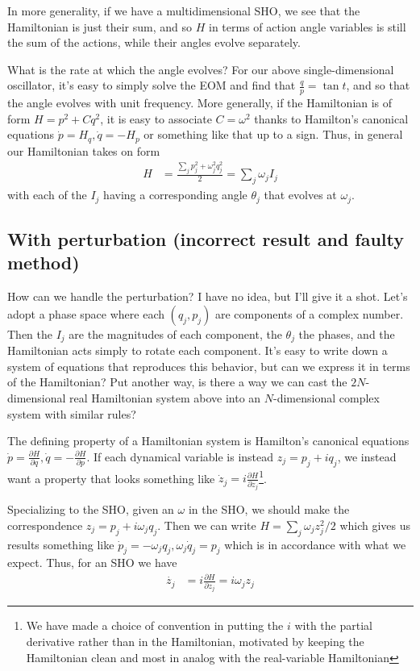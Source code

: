\documentclass[10pt]{article}
\newcommand{\pd}[2]{\frac{\partial#1}{\partial#2}}
\begin{document}
In more generality, if we have a multidimensional SHO, we see that the
Hamiltonian is just their sum, and so $H$ in terms of action angle variables is
still the sum of the actions, while their angles evolve separately.

What is the rate at which the angle evolves? For our above single-dimensional
oscillator, it's easy to simply solve the EOM and find that $\frac{q}{p} = \tan
t$, and so that the angle evolves with unit frequency. More generally, if the
Hamiltonian is of form $H = p^2 + Cq^2$, it is easy to associate $C = \omega^2$
thanks to Hamilton's canonical equations $\dot{p} = H_q, \dot{q} = -H_p$ or
something like that up to a sign. Thus, in general our Hamiltonian takes on form
\begin{align}
    H &= \frac{\sum_j p_j^2 + \omega_j^2q_j^2}{2} = \sum_j \omega_j I_j
\end{align}
with each of the $I_j$ having a corresponding angle $\theta_j$ that evolves at
$\omega_j$.

\subsection{With perturbation (incorrect result and faulty method)}

How can we handle the perturbation? I have no idea, but I'll give it a shot.
Let's adopt a phase space where each $(q_j, p_j)$ are components of a complex
number. Then the $I_j$ are the magnitudes of each component, the $\theta_j$ the
phases, and the Hamiltonian acts simply to rotate each component. It's easy to
write down a system of equations that reproduces this behavior, but can we
express it in terms of the Hamiltonian? Put another way, is there a way we can
cast the $2N$-dimensional real Hamiltonian system above into an $N$-dimensional
complex system with similar rules?

The defining property of a Hamiltonian system is Hamilton's canonical equations
$\dot{p} = \pd{H}{q}, \dot{q} = -\pd{H}{p}$. If each dynamical variable is
instead $z_j = p_j + iq_j$, we instead want a property that looks something like
$\dot{z}_j = i\pd{H}{z_j}$\footnote{We have made a choice of convention in
putting the $i$ with the partial derivative rather than in the Hamiltonian,
motivated by keeping the Hamiltonian clean and most in analog with the
real-variable Hamiltonian}.

Specializing to the SHO, given an $\omega$ in the SHO, we should make the
correspondence $z_j = p_j + i\omega_jq_j$. Then we can write $H = \sum_j
\omega_j z_j^2/2$ which gives us results something like
$\dot{p}_j = -\omega_jq_j, \omega_j\dot{q}_j = p_j$ which is in accordance with
what we expect. Thus, for an SHO we have
\begin{align}
    \dot{z_j} &= i\pd{H}{z_j} = i\omega_jz_j
\end{align}
\end{document}
